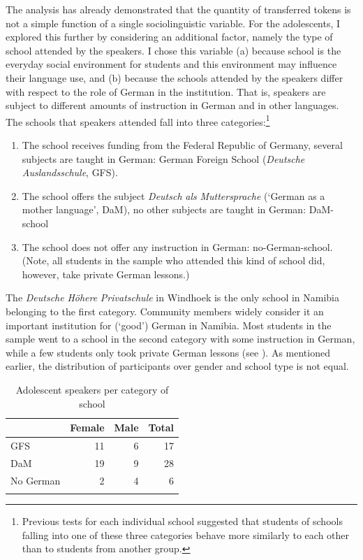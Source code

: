 \documentclass[output=paper]{langsci/langscibook}
\begin{document}
The analysis has already demonstrated that the quantity of transferred tokens is not a simple function of a single sociolinguistic variable.  For the adolescents, I explored this further by considering an additional factor, namely the type of school attended by the speakers. I chose this variable (a) because school is the everyday social environment for students and this environment may influence their language use, and (b) because the schools attended by the speakers differ with respect to the role of German in the institution. That is, speakers are subject to different amounts of instruction in German and in other languages. The schools that speakers attended fall into three categories:\footnote{Previous tests for each individual school suggested that students of schools falling into one of these three categories behave more similarly to each other than to students from another group.}

  
\begin{enumerate}   
	\item The school receives funding from the Federal Republic of Germany, several subjects are taught in German: German Foreign School (\textit{Deutsche} \textit{Auslandsschule}, GFS).
  	
	\item The school offers the subject \textit{Deutsch} \textit{als} \textit{Muttersprache} (‘German as a mother language’, DaM), no other subjects are taught in German: DaM-school
    
	\item The school does not offer any instruction in German: no-German-school. (Note, all students in the sample who attended this kind of school did, however, take private German lessons.)
 \end{enumerate}

The \textit{Deutsche} \textit{Höhere} \textit{Privatschule} in Windhoek is the only school in Namibia belonging to the first category. Community members widely consider it an important institution for (‘good’) German in Namibia. Most students in the sample went to a school in the second category with some instruction in German, while a few students only took private German lessons (see ). As mentioned earlier, the distribution of participants over gender and school type is not equal.

  

  
\begin{table}  
\begin{tabular}{lrrr}
\lsptoprule
      & \multicolumn{1}{c}{Female} & \multicolumn{1}{c}{Male} & \multicolumn{1}{c}{Total}\\
\midrule
{GFS} & {11} & {6} & {17}\\
{DaM} & {19} & {9} & {28}\\
{No German} & {2} & {4} & {6}\\
\lspbottomrule
\end{tabular}
\caption{Adolescent speakers per category of school\label{tab:bracke:6}}
\end{table}
\end{document}
